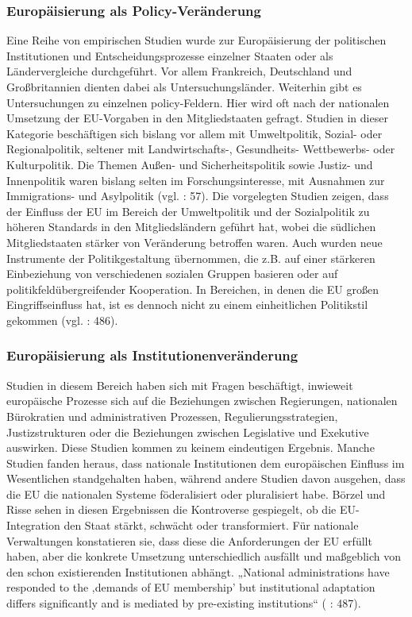 \subsubsection{Europäisierung als Policy-Veränderung}
Eine Reihe von empirischen Studien wurde zur Europäisierung der politischen Institutionen und Entscheidungsprozesse einzelner Staaten oder als Ländervergleiche durchgeführt. Vor allem Frankreich, Deutschland und Großbritannien dienten dabei als Untersuchungsländer. Weiterhin gibt es Untersuchungen zu einzelnen policy-Feldern. Hier wird oft nach der nationalen Umsetzung der EU-Vorgaben in den Mitgliedstaaten gefragt. Studien in dieser Kategorie beschäftigen sich bislang vor allem mit Umweltpolitik, Sozial- oder Regionalpolitik, seltener mit Landwirtschafts-, Gesundheits- Wettbewerbs- oder Kulturpolitik. Die Themen Außen- und Sicherheitspolitik sowie Justiz- und Innenpolitik waren bislang selten im Forschungsinteresse, mit Ausnahmen zur Immigrations- und Asylpolitik (vgl. \cite{bulmer07} : 57). Die vorgelegten Studien zeigen, dass der Einfluss der EU im Bereich der Umweltpolitik und der Sozialpolitik zu höheren Standards in den Mitgliedsländern geführt hat, wobei die südlichen Mitgliedstaaten stärker von Veränderung betroffen waren. Auch wurden neue Instrumente der Politikgestaltung übernommen, die z.B. auf einer stärkeren Einbeziehung von verschiedenen sozialen Gruppen basieren oder auf politikfeldübergreifender Kooperation. In Bereichen, in denen die EU großen Eingriffseinfluss hat, ist es dennoch nicht zu einem einheitlichen Politikstil gekommen (vgl. \cite{boeris07} : 486).
\subsubsection{Europäisierung als Institutionenveränderung }
Studien in diesem Bereich haben sich mit Fragen beschäftigt, inwieweit europäische Prozesse sich auf die Beziehungen zwischen Regierungen, nationalen Bürokratien und administrativen Prozessen, Regulierungsstrategien, Justizstrukturen oder die Beziehungen zwischen Legislative und Exekutive auswirken. Diese Studien kommen zu keinem eindeutigen Ergebnis. Manche Studien fanden heraus, dass nationale Institutionen dem europäischen Einfluss im Wesentlichen standgehalten haben, während andere Studien davon ausgehen, dass die EU die nationalen Systeme föderalisiert oder pluralisiert habe. Börzel und Risse sehen in diesen Ergebnissen die Kontroverse gespiegelt, ob die EU-Integration den Staat stärkt, schwächt oder transformiert. Für nationale Verwaltungen konstatieren sie, dass diese die Anforderungen der EU erfüllt haben, aber die konkrete Umsetzung unterschiedlich ausfällt und maßgeblich von den schon existierenden Institutionen abhängt. „National administrations have responded to the ‚demands of EU membership’ but institutional adaptation differs significantly and is mediated by pre-existing institutions“ (\cite{boeris07} : 487).
